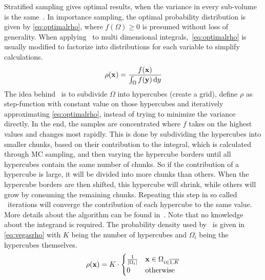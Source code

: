 Stratified sampling gives optimal results, when the variance in every
sub-volume is the same~\cite{Lepage:19781an}. In importance sampling,
the optimal probability distribution is given
by \cref{eq:optimalrho}, where \(f(\Omega) \geq 0\) is presumed
without loss of generality. When applying \vegas\ to multi dimensional
integrals,~\cref{eq:optimalrho} is usually modified to factorize into
distributions for each variable to simplify calculations.
%
\begin{equation}
  \label{eq:optimalrho}
  \rho(\vb{x}) = \frac{f(\vb{x})}{\int_\Omega f(\vb{y})\dd{y}}
\end{equation}
%
The idea behind \vegas\ is to subdivide \(\Omega\) into hypercubes
(create a grid), define \(\rho\) as step-function with constant value
on those hypercubes and iteratively approximating
\cref{eq:optimalrho}, instead of trying to minimize the variance
directly. In the end, the samples are concentrated where \(f\) takes
on the highest values and changes most rapidly. This is done by
subdividing the hypercubes into smaller chunks, based on their
contribution to the integral, which is calculated through MC sampling,
and then varying the hypercube borders until all hypercubes contain
the same number of chunks.  So if the contribution of a hypercube is
large, it will be divided into more chunks than others. When the
hypercube borders are then shifted, this hypercube will shrink, while
others will grow by consuming the remaining chunks.  Repeating this
step in so called \vegas\ iterations will converge the contribution of
each hypercube to the same value. More details about the algorithm can
be found in~\cite{Lepage:19781an}.  Note that no knowledge about the
integrand is required. The probability density used by \vegas\ is
given in \cref{eq:vegasrho} with \(K\) being the number of hypercubes
and \(\Omega_i\) being the hypercubes themselves.
%
\begin{equation}
  \label{eq:vegasrho}
  \rho(\vb{x}) = K\cdot
  \begin{cases}
    \frac{1}{\abs{\Omega_i}} & \vb{x}\in\Omega_{i\in\overline{1,K}} \\
    0 & \text{otherwise}
  \end{cases}
\end{equation}

